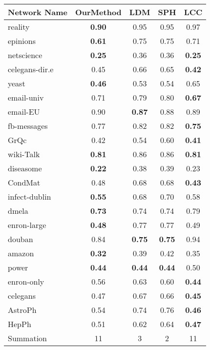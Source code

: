 \begin{tabular}{|l|cccc|}
    \hline
    \textbf{Network Name}   & \textbf{OurMethod} & \textbf{LDM}  & \textbf{SPH}  & \textbf{LCC}  \\ \hline
    \hline
    reality        & \textbf{0.90}       & 0.95 & 0.95 & 0.97 \\ \hline
    epinions       & \textbf{0.61}      & 0.75 & 0.75 & 0.71 \\ \hline
    netscience     & \textbf{0.25}      & 0.36 & 0.36 & \textbf{0.25} \\ \hline
    celegans-dir.e & 0.45      & 0.66 & 0.65 & \textbf{0.42} \\ \hline
    yeast          & \textbf{0.46}      & 0.53 & 0.54 & 0.65 \\ \hline
    email-univ     & 0.71      & 0.79 & 0.80  & \textbf{0.67} \\ \hline
    email-EU       & 0.90       & \textbf{0.87} & 0.88 & 0.89 \\ \hline
    fb-messages    & 0.77      & 0.82 & 0.82 & \textbf{0.75} \\ \hline
    GrQc           & 0.42      & 0.54 & 0.60  & \textbf{0.41} \\ \hline
    wiki-Talk      & \textbf{0.81}      & 0.86 & 0.86 & \textbf{0.81} \\ \hline
    diseasome      & \textbf{0.22}      & 0.38 & 0.39 & 0.23 \\ \hline
    CondMat        & 0.48      & 0.68 & 0.68 & \textbf{0.43} \\ \hline
    infect-dublin  & \textbf{0.55}      & 0.68 & 0.70  & 0.58 \\ \hline
    dmela          & \textbf{0.73}      & 0.74 & 0.74 & 0.79 \\ \hline
    enron-large    & \textbf{0.48}      & 0.77 & 0.77 & 0.49 \\ \hline
    douban         & 0.84      & \textbf{0.75} & \textbf{0.75} & 0.94 \\ \hline
    amazon         & \textbf{0.32}      & 0.39 & 0.42 & 0.35 \\ \hline
    power          & \textbf{0.44}      & \textbf{0.44} & \textbf{0.44} & 0.50  \\ \hline
    enron-only     & 0.56      & 0.63 & 0.60  & \textbf{0.44} \\ \hline
    celegans       & 0.47      & 0.67 & 0.66 & \textbf{0.45} \\ \hline
    AstroPh        & 0.54      & 0.74 & 0.76 & \textbf{0.46} \\ \hline
    HepPh          & 0.51      & 0.62 & 0.64 & \textbf{0.47} \\ \hline
    \hline
    Summation          & 11      & 3 & 2 & 11 \\ \hline
    \end{tabular}